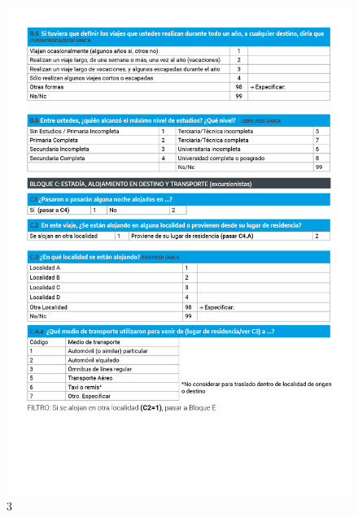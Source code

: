 \documentclass[
]{book}
\begin{document}
\begin{figure}

{\centering \includegraphics[width=1\linewidth]{imagenes/graf03} 

}

\caption{3}\label{fig:003}
\end{figure}
\end{document}
